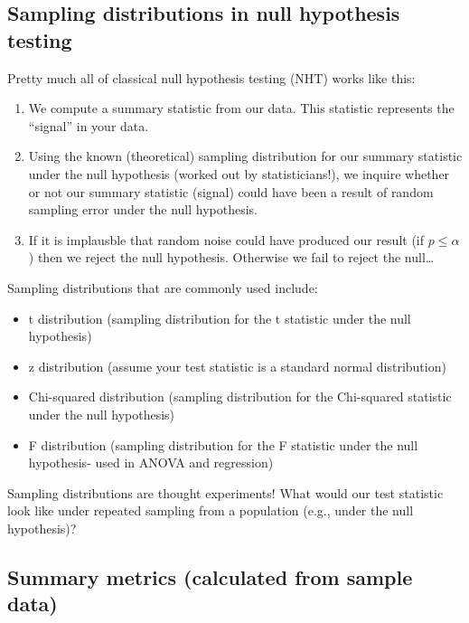 \documentclass[
]{article}
\providecommand{\tightlist}{%
  \setlength{\itemsep}{0pt}\setlength{\parskip}{0pt}}
\begin{document}
\hypertarget{sampling-distributions-in-null-hypothesis-testing}{%
\subsection{Sampling distributions in null hypothesis
testing}\label{sampling-distributions-in-null-hypothesis-testing}}

Pretty much all of classical null hypothesis testing (NHT) works like
this:

\begin{enumerate}
\def\labelenumi{\arabic{enumi}.}
\tightlist
\item
  We compute a summary statistic from our data. This statistic
  represents the ``signal'' in your data.\\
\item
  Using the known (theoretical) sampling distribution for our summary
  statistic under the null hypothesis (worked out by statisticians!), we
  inquire whether or not our summary statistic (signal) could have been
  a result of random sampling error under the null hypothesis.
\item
  If it is implausble that random noise could have produced our result
  (if \(p\le\alpha\)) then we reject the null hypothesis. Otherwise we
  fail to reject the null\ldots{}
\end{enumerate}

Sampling distributions that are commonly used include:

\begin{itemize}
\tightlist
\item
  t distribution (sampling distribution for the t statistic under the
  null hypothesis)
\item
  z distribution (assume your test statistic is a standard normal
  distribution)
\item
  Chi-squared distribution (sampling distribution for the Chi-squared
  statistic under the null hypothesis)
\item
  F distribution (sampling distribution for the F statistic under the
  null hypothesis- used in ANOVA and regression)
\end{itemize}

Sampling distributions are thought experiments! What would our test
statistic look like under repeated sampling from a population (e.g.,
under the null hypothesis)?

\hypertarget{summary-metrics-calculated-from-sample-data}{%
\subsection{Summary metrics (calculated from sample
data)}\label{summary-metrics-calculated-from-sample-data}}
\end{document}
